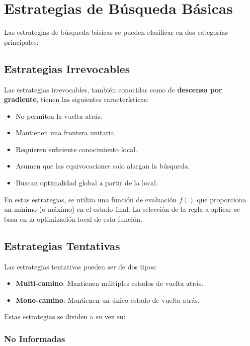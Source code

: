 \documentclass[12pt,a4paper]{report}
\begin{document}
	\section{Estrategias de Búsqueda Básicas}
	
	Las estrategias de búsqueda básicas se pueden clasificar en dos categorías principales:
	
	\subsection{Estrategias Irrevocables}
	
	Las estrategias irrevocables, también conocidas como de \textbf{descenso por gradiente}, tienen las siguientes características:
	
	\begin{itemize}
		\item No permiten la vuelta atrás.
		\item Mantienen una frontera unitaria.
		\item Requieren suficiente conocimiento local.
		\item Asumen que las equivocaciones solo alargan la búsqueda.
		\item Buscan optimalidad global a partir de la local.
	\end{itemize}
	
	En estas estrategias, se utiliza una función de evaluación $f()$ que proporciona un mínimo (o máximo) en el estado final. La selección de la regla a aplicar se basa en la optimización local de esta función.
	
	\subsection{Estrategias Tentativas}
	
	Las estrategias tentativas pueden ser de dos tipos:
	
	\begin{itemize}
		\item \textbf{Multi-camino}: Mantienen múltiples estados de vuelta atrás.
		\item \textbf{Mono-camino}: Mantienen un único estado de vuelta atrás.
	\end{itemize}
	
	Estas estrategias se dividen a su vez en:
	
	\subsubsection{No Informadas}
	
\end{document}
